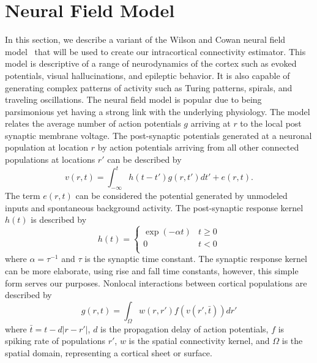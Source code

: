 \documentclass[onecolumn,draftcls]{IEEEtran}
\begin{document}
\section{Neural Field Model}
In this section, we describe a variant of the  Wilson and Cowan neural field model~\cite{Wilson1973} that will be used to create our intracortical connectivity estimator. This model is descriptive of a range of neurodynamics of the cortex such as evoked potentials, visual hallucinations, and epileptic behavior. It is also capable of generating complex patterns of activity such as Turing patterns, spirals, and traveling oscillations. The neural field model is popular due to being parsimonious yet having a strong link with the underlying physiology.
The model relates the average number of action potentials $g$ arriving at $r$ to the local post synaptic membrane voltage. The post-synaptic potentials generated at a neuronal population at location $r$ by action potentials arriving from all other connected populations at locations $r'$ can be described by
\begin{equation}\label{SpikesToPotential}
v\left( {r,t} \right) = \int_{ - \infty }^t {h\left( {t - t'} \right)g\left( {r,t'} \right)dt'} + e\left( {r,t} \right).
\end{equation}
The term $e(r,t)$ can be considered the potential generated by unmodeled inputs and spontaneous background activity. The post-synaptic response kernel $h(t)$ is described by
\begin{equation}\label{SynapticRespKernel}
h(t) = \left\{ {\begin{array}{*{20}{c}}
   {\exp ( - \alpha t)} & {t \ge 0}  \\
   0 & {t < 0}  \\
\end{array}} \right.
\end{equation}
where $\alpha=\tau^{-1}$ and $\tau$ is the synaptic time constant. The synaptic response kernel can be more elaborate, using rise and fall time constants, however, this simple form serves our purposes. Nonlocal interactions between cortical populations are described by	
\begin{equation}\label{RateBasedInteractions}
g\left( {r,t} \right) = \int_\Omega  {w\left( {r,r'} \right)f\left( {v\left( {r',\bar t} \right)} \right)dr'}
\end{equation}
where $\bar t = t - d\left| {r - r'} \right|$, $d$ is the propagation delay of action potentials, $f$ is spiking rate of populations $r'$, $w$ is the spatial connectivity kernel, and $\Omega$ is the spatial domain, representing a cortical sheet or surface.
\end{document}

